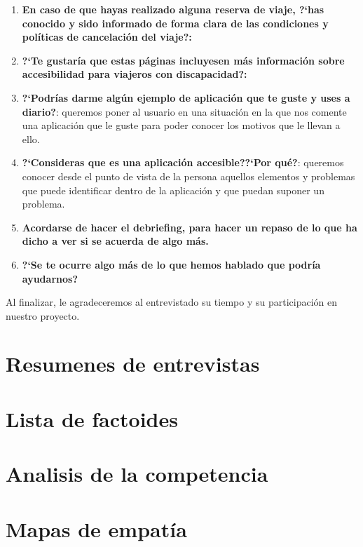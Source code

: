 \begin{enumerate}
    \item {\textbf{En caso de que hayas realizado alguna reserva de viaje, ?`has conocido y sido informado de forma clara de las condiciones
                        y políticas de cancelación del viaje?:}}
    \item {\textbf{?`Te gustaría que estas páginas incluyesen más información sobre accesibilidad para viajeros con discapacidad?:}}
    \item {\textbf{?`Podrías darme algún ejemplo de aplicación que te guste y uses a diario?}}: queremos poner al usuario en una situación
    en la que nos comente una aplicación que le guste para poder conocer los motivos que le llevan a ello.
    \item {\textbf{?`Consideras que es una aplicación accesible??`Por qué?}}: queremos conocer desde el punto de vista de la persona aquellos
    elementos y problemas que puede identificar dentro de la aplicación y que puedan suponer un problema.
    \item {\textbf{Acordarse de hacer el debriefing, para hacer un repaso de lo que ha dicho a ver si se acuerda de algo más.}}
    \item {\textbf{?`Se te ocurre algo más de lo que hemos hablado que podría ayudarnos?}}
\end{enumerate}

Al finalizar, le agradeceremos al entrevistado su tiempo y su participación en nuestro proyecto.


\section{Resumenes de entrevistas}

\section{Lista de factoides}

\section{Analisis de la competencia}

\section{Mapas de empatía}

